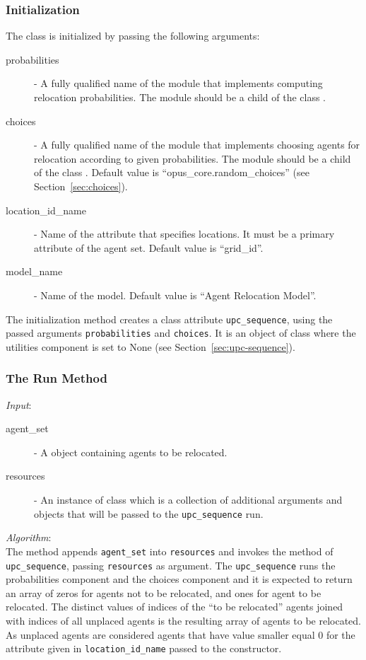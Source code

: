 \subsubsection{Initialization}
%
The class is initialized by passing the following arguments:
\begin{description}
\item[probabilities] - A fully qualified name of the module that implements
  computing relocation probabilities. The module should be a child of the
   class .
\item[choices] - A fully qualified name of the module that implements choosing
  agents for relocation according to given probabilities. The module should be
  a child of the  class .  Default value is
  ``opus_core.random_choices'' (see Section~\ref{sec:choices}).
\item[location_id_name] - Name of the attribute that specifies locations. It
  must be a primary attribute \primaryattributesindex of the agent set. Default value is
  ``grid_id''.
\item[model_name] - Name of the model. Default value is ``Agent Relocation
  Model''. 
\end{description}
The initialization method creates a class attribute \verb|upc_sequence|, using
the passed arguments \verb|probabilities| and \verb|choices|. It is an object
of class  where the utilities component is set to None
(see Section~\ref{sec:upc-sequence}).

%
\subsubsection{The Run Method}
%
{\it Input}:
\begin{description}
\item[agent_set] - A  object containing agents to be relocated.
\item[resources] - An instance of class  which is a
  collection of additional arguments and objects that will be passed to the
  \verb|upc_sequence| run.
\end{description}

{\it Algorithm}:~\\[1mm]
The method appends \verb|agent_set| into \verb|resources| and invokes the
 method of \verb|upc_sequence|, passing \verb|resources| as
argument. The \verb|upc_sequence| runs the probabilities component and the
choices component and it is expected to return an array of zeros for agents
not to be relocated, and ones for agent to be relocated. The distinct values
of indices of the ``to be relocated'' agents joined with indices of all
unplaced agents is the resulting array of agents to be relocated. As unplaced
agents are considered agents that have value smaller equal 0 for the attribute
given in \verb|location_id_name| passed to the constructor.

